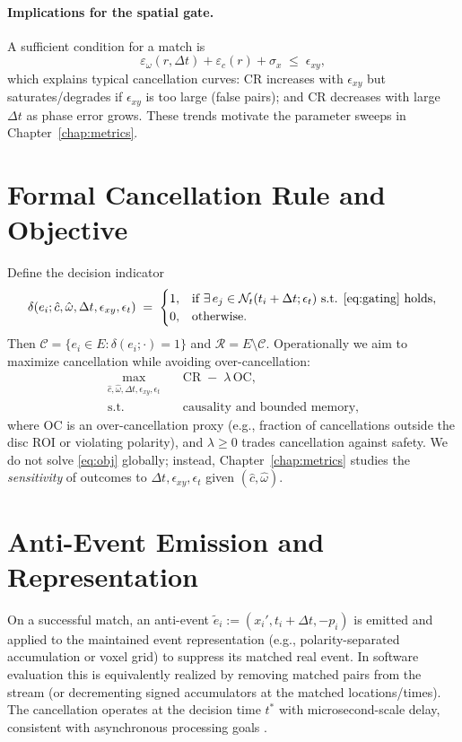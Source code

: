 \paragraph{Implications for the spatial gate.}
A sufficient condition for a match is
\begin{equation}
\varepsilon_{\omega}(r,\Delta t) + \varepsilon_c(r) + \sigma_x \;\le\; \epsilon_{xy},
\label{eq:gate-condition}
\end{equation}
which explains typical cancellation curves: $\mathrm{CR}$ increases with $\epsilon_{xy}$ but saturates/degrades if $\epsilon_{xy}$ is too large (false pairs); and $\mathrm{CR}$ decreases with large $\Delta t$ as phase error grows. These trends motivate the parameter sweeps in Chapter~\ref{chap:metrics}.

\section{Formal Cancellation Rule and Objective}
Define the decision indicator
\begin{equation}
\delta(e_i; \hat c,\hat\omega,\Delta t,\epsilon_{xy},\epsilon_t) \;=\;
\begin{cases}
1, & \text{if } \exists\, e_j \in \mathcal{N}_t(t_i+\Delta t;\epsilon_t) \text{ s.t. } \eqref{eq:gating}\text{ holds},\\
0, & \text{otherwise.}
\end{cases}
\label{eq:delta-indicator}
\end{equation}
Then $\mathcal{C}=\{e_i\in E:\delta(e_i;\cdot)=1\}$ and $\mathcal{R}=E\setminus \mathcal{C}$. Operationally we aim to maximize cancellation while avoiding over-cancellation:
\begin{align}
\max_{\hat c,\hat\omega,\Delta t,\epsilon_{xy},\epsilon_t} \quad & \mathrm{CR} \;-\; \lambda\, \mathrm{OC}, 
\label{eq:obj}\\
\text{s.t.} \quad & \text{causality and bounded memory},
\nonumber
\end{align}
where $\mathrm{OC}$ is an over-cancellation proxy (e.g., fraction of cancellations outside the disc ROI or violating polarity), and $\lambda\ge 0$ trades cancellation against safety. We do not solve \eqref{eq:obj} globally; instead, Chapter~\ref{chap:metrics} studies the \emph{sensitivity} of outcomes to $\Delta t,\epsilon_{xy},\epsilon_t$ given $(\hat c,\hat\omega)$.

\section{Anti-Event Emission and Representation}
On a successful match, an anti-event $\tilde e_i := (x_i', t_i+\Delta t, -p_i)$ is emitted and applied to the maintained event representation (e.g., polarity-separated accumulation or voxel grid) to suppress its matched real event. In software evaluation this is equivalently realized by removing matched pairs from the stream (or decrementing signed accumulators at the matched locations/times). The cancellation operates at the decision time $t^*$ with microsecond-scale delay, consistent with asynchronous processing goals \cite{Gallego2018CMax,Bardow2016SOFIE}.

